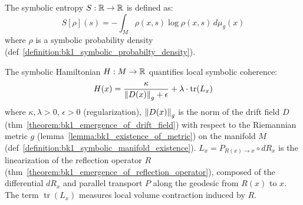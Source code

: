 \begin{definition}
\label{definition:bk1_symbolic_entropy}
The symbolic entropy \( S: \mathbb{R} \to \mathbb{R} \) is defined as:
\[
S[\rho](s) = -\int_M \rho(x,s) \log \rho(x,s) \, d\mu_g(x)
\]
where $\rho$ is a symbolic probability density (def~\ref{definition:bk1_symbolic_probabilty_density}).
\end{definition}

\begin{definition}
\label{definition:bk1_symbolic_hamiltonian}
The symbolic Hamiltonian $H: M \to \mathbb{R}$ quantifies local symbolic coherence:
\[
H(x) = \frac{\kappa}{\left\|D(x)\right\|_g + \epsilon} + \lambda \cdot \operatorname{tr}(L_x)
\]
where $\kappa, \lambda > 0$, $\epsilon > 0$ (regularization), $\left\|D(x)\right\|_g$ is the norm of the drift field $D$ (thm~\ref{theorem:bk1_emergence_of_drift_field}) with respect to the Riemannian metric $g$ (lemma~\ref{lemma:bk1_existence_of_metric}) on the manifold $M$ (def~\ref{definition:bk1_symbolic_manifold_existence}). $L_x = P_{R(x) \to x} \circ dR_x$ is the linearization of the reflection operator $R$ (thm~\ref{theorem:bk1_emergence_of_reflection_operator}), composed of the differential $dR_x$ and parallel transport $P$ along the geodesic from $R(x)$ to $x$. The term $\operatorname{tr}(L_x)$ measures local volume contraction induced by $R$.
\end{definition}
